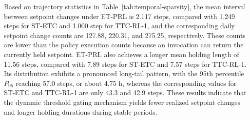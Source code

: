 \documentclass[preprint,12pt]{elsarticle}
\begin{document}
\begin{table}[htbp]
\centering
\caption{Temporal sparsity and action holding statistics of different control strategies}\label{tab:temporal-sparsity}
\small
\setlength{\tabcolsep}{8pt}
\renewcommand{\arraystretch}{1.15}
\end{table}

Based on trajectory statistics in Table~\ref{tab:temporal-sparsity}, the mean interval between setpoint changes under ET-PRL is 2.117 steps, compared with 1.249 steps for ST-ETC and 1.000 step for TTC-RL-1, and the corresponding daily setpoint change counts are 127.88, 220.31, and 275.25, respectively. These counts are lower than the policy execution counts because an invocation can return the currently held setpoint. ET-PRL also achieves a longer mean holding length of 11.56 steps, compared with 7.89 steps for ST-ETC and 7.57 steps for TTC-RL-1. Its distribution exhibits a pronounced long-tail pattern, with the 95th percentile \(P_{95}\) reaching 57.0 steps, or about 4.75 h, whereas the corresponding values for ST-ETC and TTC-RL-1 are only 43.3 and 42.9 steps. These results indicate that the dynamic threshold gating mechanism yields fewer realized setpoint changes and longer holding durations during stable periods.
\end{document}
